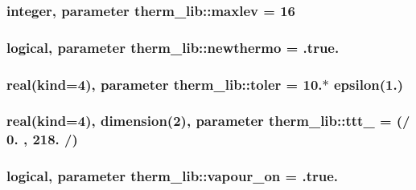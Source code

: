 \subsubsection[{\texorpdfstring{maxlev}{maxlev}}]{\setlength{\rightskip}{0pt plus 5cm}integer, parameter therm\+\_\+lib\+::maxlev = 16}\hypertarget{namespacetherm__lib_a4369cbefc67fc26498b97b24ca760dcd}{}\label{namespacetherm__lib_a4369cbefc67fc26498b97b24ca760dcd}
\subsubsection[{\texorpdfstring{newthermo}{newthermo}}]{\setlength{\rightskip}{0pt plus 5cm}logical, parameter therm\+\_\+lib\+::newthermo = .true.}\hypertarget{namespacetherm__lib_ac36c121987554589b16d515ddc351939}{}\label{namespacetherm__lib_ac36c121987554589b16d515ddc351939}
\subsubsection[{\texorpdfstring{toler}{toler}}]{\setlength{\rightskip}{0pt plus 5cm}real(kind=4), parameter therm\+\_\+lib\+::toler = 10.$\ast$ epsilon(1.)}\hypertarget{namespacetherm__lib_a4855f01e51a3fcf9e35d4f7d17156819}{}\label{namespacetherm__lib_a4855f01e51a3fcf9e35d4f7d17156819}
\subsubsection[{\texorpdfstring{ttt\+\_\+10}{ttt_10}}]{\setlength{\rightskip}{0pt plus 5cm}real(kind=4), dimension(2), parameter therm\+\_\+lib\+::ttt\+\_ = (/ 0. , 218. /)}\hypertarget{namespacetherm__lib_afb689f706983009dfc62f3f4d0f85dc7}{}\label{namespacetherm__lib_afb689f706983009dfc62f3f4d0f85dc7}
\subsubsection[{\texorpdfstring{vapour\+\_\+on}{vapour_on}}]{\setlength{\rightskip}{0pt plus 5cm}logical, parameter therm\+\_\+lib\+::vapour\+\_\+on = .true.}\hypertarget{namespacetherm__lib_a7c4a4113d6d2548dd389c9eefce0396e}{}\label{namespacetherm__lib_a7c4a4113d6d2548dd389c9eefce0396e}
